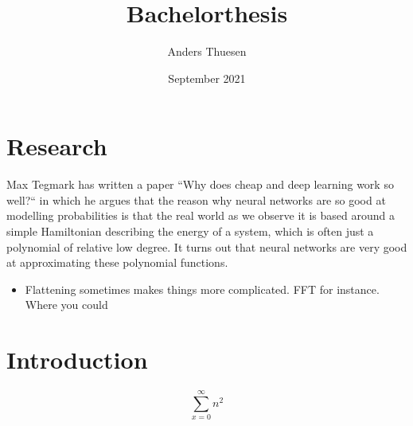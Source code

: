 \documentclass{article}
\title{Bachelorthesis}
\author{Anders Thuesen}
\date{September 2021}
\begin{document}
\maketitle

\section{Research}
Max Tegmark has written a paper ``Why does cheap and deep learning work so well?`` in which he argues that the reason why neural networks are so good at modelling probabilities is that the real world as we observe it is based around a simple Hamiltonian describing the energy of a system, which is often just a polynomial of relative low degree. It turns out that neural networks are very good at approximating these polynomial functions.

\begin{itemize}
  \item Flattening sometimes makes things more complicated. FFT for instance. Where you could 
\end{itemize}

\section{Introduction}

\[
  \sum_{x=0}^{\infty}{n^2}
\]
\end{document}
